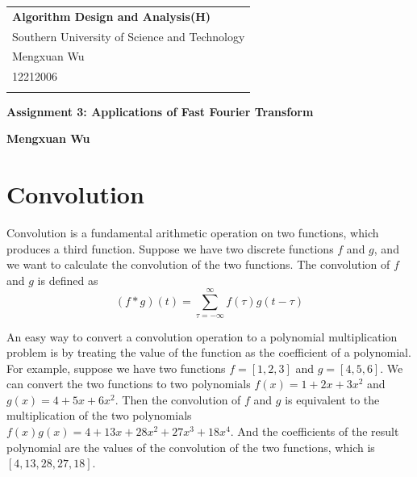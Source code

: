 \documentclass[a4paper,12pt]{article}
\begin{document}
\thispagestyle{empty} %

\begin{tabular}{p{15.5cm}}
{\large \bf Algorithm Design and Analysis(H)} \\
Southern University of Science and Technology \\ Mengxuan Wu \\ 12212006 \\
\hline
\\
\end{tabular}

\vspace*{0.3cm} %

\begin{center}
	{\Large \bf Assignment 3: Applications of Fast Fourier Transform}
	\vspace{2mm}

	{\bf Mengxuan Wu}
		
\end{center}  

\vspace*{0.4cm}

\section{Convolution}

Convolution is a fundamental arithmetic operation on two functions, which produces a third function.
Suppose we have two discrete functions $f$ and $g$, and we want to calculate the convolution of the two functions.
The convolution of $f$ and $g$ is defined as
\begin{equation*}
	(f * g)(t) = \sum_{\tau = -\infty}^{\infty} f(\tau)g(t - \tau)
\end{equation*}

An easy way to convert a convolution operation to a polynomial multiplication problem is by treating the value of the function as the coefficient of a polynomial.
For example, suppose we have two functions $f = [1, 2, 3]$ and $g = [4, 5, 6]$.
We can convert the two functions to two polynomials $f(x) = 1 + 2x + 3x^2$ and $g(x) = 4 + 5x + 6x^2$.
Then the convolution of $f$ and $g$ is equivalent to the multiplication of the two polynomials $f(x)g(x) = 4 + 13x + 28x^2 + 27x^3 + 18x^4$.
And the coefficients of the result polynomial are the values of the convolution of the two functions, which is $[4, 13, 28, 27, 18]$.
\end{document}
